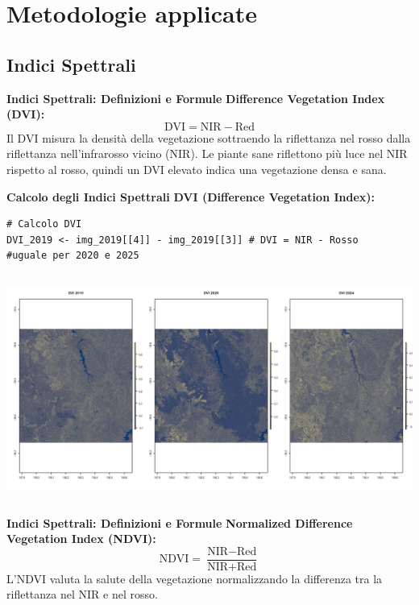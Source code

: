 \documentclass{beamer}
\begin{document}
\section{Metodologie applicate}

\subsection{Indici Spettrali}

\begin{frame}{\textbf{Indici Spettrali: Definizioni e Formule}}
\textbf{Difference Vegetation Index (DVI):}
\newline
\begin{equation}
\text{DVI} = \text{NIR} - \text{Red}
\end{equation}
\newline
Il DVI misura la densità della vegetazione sottraendo la riflettanza nel rosso dalla riflettanza nell'infrarosso vicino (NIR). 
\newline
Le piante sane riflettono più luce nel NIR rispetto al rosso, quindi un DVI elevato indica una vegetazione densa e sana.
\end{frame}

\begin{frame}[fragile]{\textbf{Calcolo degli Indici Spettrali}}
\textbf{DVI (Difference Vegetation Index):}
\begin{lstlisting}
# Calcolo DVI
DVI_2019 <- img_2019[[4]] - img_2019[[3]] # DVI = NIR - Rosso
#uguale per 2020 e 2025
\end{lstlisting}
\begin{columns}
    \centering
    \includegraphics[width=\textwidth]{DVI.png}
\end{columns}
\end{frame}

\begin{frame}{\textbf{Indici Spettrali: Definizioni e Formule}}
\textbf{Normalized Difference Vegetation Index (NDVI):}
\newline
\begin{equation}
\text{NDVI} = \frac{\text{NIR} - \text{Red}}{\text{NIR} + \text{Red}}
\end{equation}
\newline
L'NDVI valuta la salute della vegetazione normalizzando la differenza tra la riflettanza nel NIR e nel rosso.
\end{frame}
\end{document}
